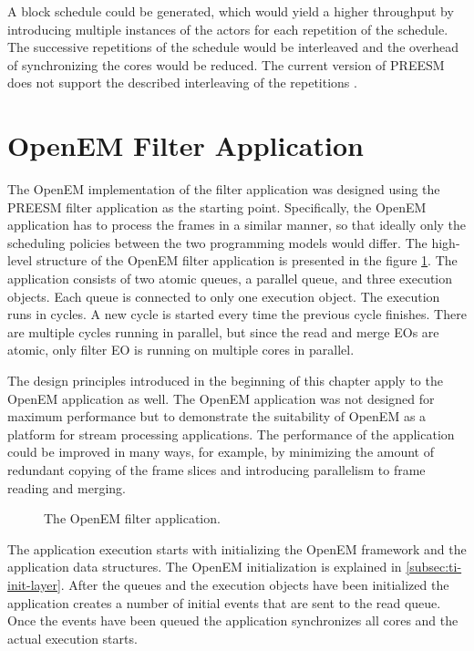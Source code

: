 A block schedule could be generated, which would yield a higher throughput by introducing multiple instances of the actors for each repetition of the schedule. The successive repetitions of the schedule would be interleaved and the overhead of synchronizing the cores would be reduced. The current version of PREESM does not support the described interleaving of the repetitions \cite{pelcat2014preesm}.

\section{OpenEM Filter Application}
\label{sec:oemapp}
The OpenEM implementation of the filter application was designed using the PREESM filter application as the starting point. Specifically, the OpenEM application has to process the frames in a similar manner, so that ideally only the scheduling policies between the two programming models would differ. The high-level structure of the OpenEM filter application is presented in the figure \ref{fig:openem_flow}. The application consists of two atomic queues, a parallel queue, and three execution objects. Each queue is connected to only one execution object. The execution runs in cycles. A new cycle is started every time the previous cycle finishes. There are multiple cycles running in parallel, but since the read and merge EOs are atomic, only filter EO is running on multiple cores in parallel.

The design principles introduced in the beginning of this chapter apply to the OpenEM application as well. The OpenEM application was not designed for maximum performance but to demonstrate the suitability of OpenEM as a platform for stream processing applications. The performance of the application could be improved in many ways, for example, by minimizing the amount of redundant copying of the frame slices and introducing parallelism to frame reading and merging.

\begin{figure}[h!]
    \begin{center}
        
        \caption{The OpenEM filter application.}
        \label{fig:openem_flow}
    \end{center}
\end{figure}

The application execution starts with initializing the OpenEM framework and the application data structures. The OpenEM initialization is explained in \ref{subsec:ti-init-layer}. After the queues and the execution objects have been initialized the application creates a number of initial events that are sent to the read queue. Once the events have been queued the application synchronizes all cores and the actual execution starts.

